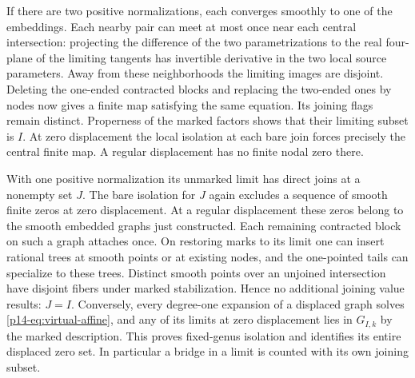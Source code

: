 If there are two positive normalizations, each converges smoothly
to one of the embeddings. Each nearby pair can meet at most once
near each central intersection: projecting the difference of the two
parametrizations to the real four-plane of the limiting tangents has
invertible derivative in the two local source parameters. Away from
these neighborhoods the limiting images are disjoint. Deleting the
one-ended contracted blocks and replacing the two-ended ones by nodes
now gives a finite map satisfying the same equation. Its joining
flags remain distinct. Properness of the marked factors shows that
their limiting subset is $I$. At zero displacement the local isolation
at each bare join forces precisely the central finite map. A regular
displacement has no finite nodal zero there.

With one positive normalization its unmarked limit has direct joins
at a nonempty set $J$. The bare isolation for $J$ again excludes a
sequence of smooth finite zeros at zero displacement. At a regular
displacement these zeros belong to the smooth embedded graphs just
constructed. Each remaining contracted block on such a graph attaches
once. On restoring marks to its limit one can insert rational trees
at smooth points or at existing nodes, and the one-pointed tails
can specialize to these trees. Distinct smooth points over an unjoined
intersection have disjoint fibers under marked stabilization. Hence
no additional joining value results: $J=I$. Conversely, every
degree-one expansion of a displaced graph solves
\eqref{p14-eq:virtual-affine}, and any of its limits at zero displacement
lies in $G_{I,k}$ by the marked description. This proves fixed-genus
isolation and identifies its entire displaced zero set. In particular
a bridge in a limit is counted with its own joining subset.

